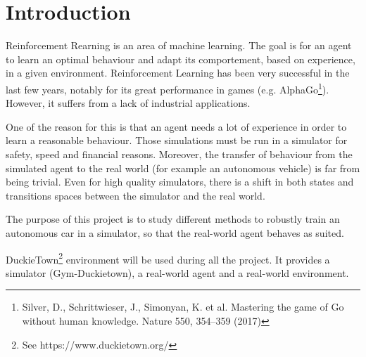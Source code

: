 \chapter*{Introduction}

Reinforcement Rearning is an area of machine learning. 
The goal is for an agent to learn an optimal behaviour and adapt its comportement, based on experience, in a given environment. 
Reinforcement Learning has been very successful in the last few years, notably for its great performance in games (e.g. AlphaGo\footnote{Silver, D., Schrittwieser, J., Simonyan, K. et al. Mastering the game of Go without human knowledge. Nature 550, 354–359 (2017)}). 
However, it suffers from a lack of industrial applications.

One of the reason for this is that an agent needs a lot of experience in order to learn a reasonable behaviour. 
Those simulations must be run in a simulator for safety, speed and financial reasons. 
Moreover, the transfer of behaviour from the simulated agent to the real world (for example an autonomous vehicle) is far from being trivial.
Even for high quality simulators, there is a shift in both states and transitions spaces between the simulator and the real world.

The purpose of this project is to study different methods to robustly train an autonomous car in a simulator, so that the real-world agent behaves as suited.


DuckieTown\footnote{See https://www.duckietown.org/} environment will be used during all the project.
It provides a simulator (Gym-Duckietown), a real-world agent and a real-world environment. 

